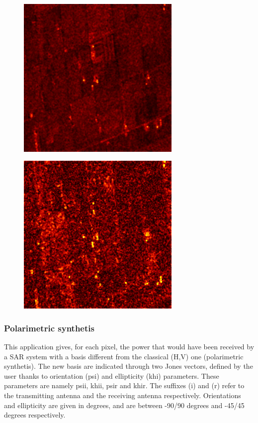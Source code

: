 \begin{figure}[!h]
\center
\includegraphics[width=0.7\textwidth]{../Art/SARImages/alphahot.png}
\label{fig:alphaimage}
\end{figure}

\begin{figure}[!h]
\center
\includegraphics[width=0.7\textwidth]{../Art/SARImages/anisotropyhot.png}
\label{fig:anisotropyimage}
\end{figure}

\subsubsection{Polarimetric synthetis}

This application gives, for each pixel, the power that would have been received
by a SAR system with a basis different from the classical (H,V) one
(polarimetric synthetis).  The new basis are indicated through two Jones
vectors, defined by the user thanks to orientation (psi) and ellipticity (khi)
parameters.  These parameters are namely psii, khii, psir and khir. The suffixes
(i) and (r) refer to the transmitting antenna and the receiving antenna
respectively.  Orientations and ellipticity are given in degrees, and are
between -90/90 degrees and -45/45 degrees respectively.

